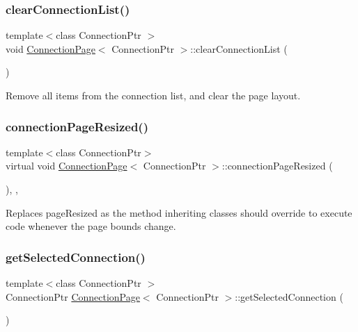 \subsubsection{\texorpdfstring{clear\+Connection\+List()}{clearConnectionList()}}
{\footnotesize\ttfamily template$<$class Connection\+Ptr $>$ \\
void \mbox{\hyperlink{classConnectionPage}{Connection\+Page}}$<$ Connection\+Ptr $>$\+::clear\+Connection\+List (\begin{DoxyParamCaption}{ }\end{DoxyParamCaption})\hspace{0.3cm}{\ttfamily [protected]}}

Remove all items from the connection list, and clear the page layout. \mbox{\label{classConnectionPage_a12e25d7627e450f9fe03ed557cb01d44}} 
\subsubsection{\texorpdfstring{connection\+Page\+Resized()}{connectionPageResized()}}
{\footnotesize\ttfamily template$<$class Connection\+Ptr$>$ \\
virtual void \mbox{\hyperlink{classConnectionPage}{Connection\+Page}}$<$ Connection\+Ptr $>$\+::connection\+Page\+Resized (\begin{DoxyParamCaption}{ }\end{DoxyParamCaption})\hspace{0.3cm}{\ttfamily [inline]}, {\ttfamily [protected]}, {\ttfamily [virtual]}}

Replaces page\+Resized as the method inheriting classes should override to execute code whenever the page bounds change. \mbox{\label{classConnectionPage_a2ca9921ccbb7a4306fa4d77ebf5a0759}} 
\subsubsection{\texorpdfstring{get\+Selected\+Connection()}{getSelectedConnection()}}
{\footnotesize\ttfamily template$<$class Connection\+Ptr $>$ \\
Connection\+Ptr \mbox{\hyperlink{classConnectionPage}{Connection\+Page}}$<$ Connection\+Ptr $>$\+::get\+Selected\+Connection (\begin{DoxyParamCaption}{ }\end{DoxyParamCaption})\hspace{0.3cm}{\ttfamily [protected]}}

